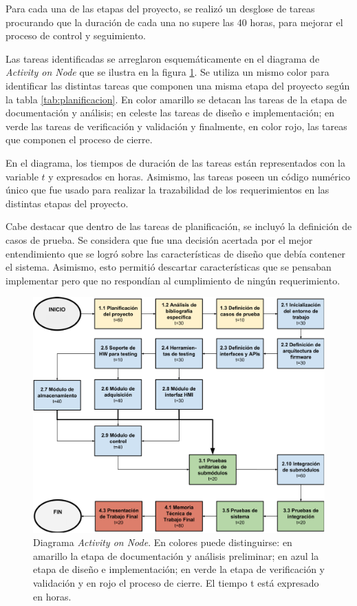 \vspace{20px}

Para cada una de las etapas del proyecto, se realizó un desglose de tareas procurando que la duración de cada una no supere las 40 horas, para mejorar el proceso de control y seguimiento.

Las tareas identificadas se arreglaron esquemáticamente en el diagrama de \textit{Activity on Node} que se ilustra en la figura \ref{fig:AoN}. Se utiliza un mismo color para identificar las distintas tareas que componen una misma etapa del proyecto según la tabla \ref{tab:planificacion}. En color amarillo se detacan las tareas de la etapa de documentación y análisis; en celeste las tareas de diseño e implementación; en verde las tareas de verificación y validación y finalmente, en color rojo, las tareas que componen el proceso de cierre. 

En el diagrama, los tiempos de duración de las tareas están representados con la variable $t$ y expresados en horas. Asimismo, las tareas poseen un código numérico único que fue usado para realizar la trazabilidad de los requerimientos en las distintas etapas del proyecto.

Cabe destacar que dentro de las tareas de planificación, se incluyó la definición de casos de prueba.  Se considera que fue una decisión acertada por el mejor entendimiento que se logró sobre las características de diseño que debía contener el sistema. Asimismo, esto permitió descartar características que se pensaban implementar pero que no respondían al cumplimiento de ningún requerimiento. 

\begin{figure}[htpb]
	\centering
	\includegraphics[width=\textwidth]{./Figures/AoN.pdf}
	\caption[Diagrama \textit{Activity on Node}.]{Diagrama \textit{Activity on Node}.  En colores puede distinguirse: en amarillo la etapa de documentación y análisis preliminar; en azul la etapa de diseño e implementación; en verde la etapa de verificación y validación y en rojo el proceso de cierre. El tiempo t está expresado en horas.}
	\label{fig:AoN}
\end{figure}

